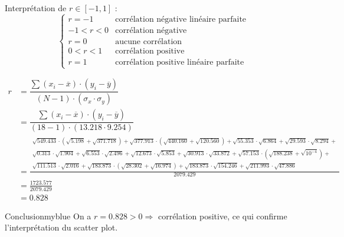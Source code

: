 \documentclass{article}
\begin{document}
\begin{enumerate}
Interprétation de \( r \in [-1, 1] \) :
\[
    \begin{cases}
        r = -1      &  \text{corrélation négative linéaire parfaite}      \\
        -1 < r < 0  &  \text{corrélation négative}    \\
        r = 0       &  \text{aucune corrélation}   \\
        0 < r < 1   &  \text{corrélation positive} \\
        r = 1       &  \text{corrélation positive linéaire parfaite}
    \end{cases}
\]

\begin{align*}
    r  & =\dfrac{\sum (x_i - \overline{x}) \cdot (y_i - \overline{y})}{(N-1) \cdot (\sigma_x \cdot \sigma_y)} \\[0.25cm]
     & =\dfrac{\sum (x_i - \overline{x}) \cdot (y_i - \overline{y})}{(18-1) \cdot (13.218 \cdot 9.254)} \\[0.25cm]
                    &= \frac{
                        \substack {\sqrt{549.433} \cdot ( \sqrt{5.198} + \sqrt{371.718}) + \sqrt{377.913} \cdot ( \sqrt{440.160}  + \sqrt{120.560})
                            + \sqrt{55.353} \cdot \sqrt{6.864} + \sqrt{29.593} \cdot \sqrt{8.294} + \\  
                            \sqrt{0.313} \cdot \sqrt{1.904}+ \sqrt{6.553} \cdot \sqrt{2.496}+ \sqrt{12.673} \cdot \sqrt{5.853} + \sqrt{30.913} \cdot \sqrt{33.872}
                            + \sqrt{57.153} \cdot (\sqrt{188.238} + \sqrt{10^{-4}}) + \\
                        \sqrt{111.513}\cdot\sqrt{2.016}  + \sqrt{183.873} \cdot (\sqrt{28.302} + \sqrt{16.974}) + \sqrt{183.873} \cdot \sqrt{154.246} + \sqrt{211.993} \cdot \sqrt{47.886}}
                    }{2079.429}\\[0.25cm]
                    &= \frac{1723.577}{2079.429}\\[0.25cm]
                     &= \boxed { 0.828}
    \end{align*}

    \vspace{0.5cm}

    \begin{prettyBox}{Conclusion}{myblue}
On a \( r = 0.828 > 0 \Rightarrow \) corrélation positive, ce qui confirme l’interprétation du scatter plot.
    \end{prettyBox}




\end{enumerate}
\end{document}
